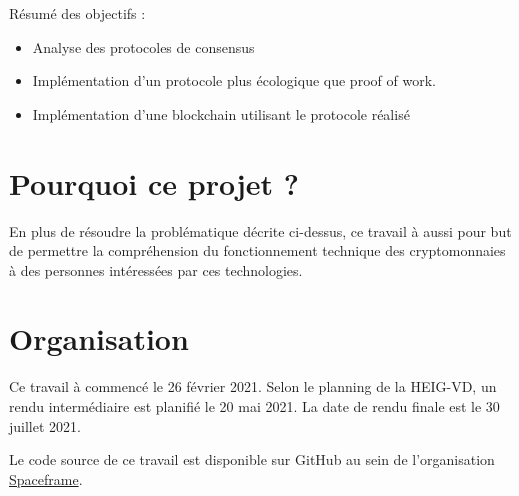 Résumé des objectifs :
\begin{itemize}
    \item Analyse des protocoles de consensus
    \item Implémentation d'un protocole plus écologique que proof of work.
    \item Implémentation d'une blockchain utilisant le protocole réalisé
\end{itemize}

\section{Pourquoi ce projet ?}

En plus de résoudre la problématique décrite ci-dessus, ce travail à aussi pour but de permettre la compréhension du fonctionnement technique des cryptomonnaies à des personnes intéressées par ces technologies.

\section{Organisation}

Ce travail à commencé le 26 février 2021.
Selon le planning de la HEIG-VD, un rendu intermédiaire est planifié le 20 mai 2021. La date de rendu finale est le 30 juillet 2021.

Le code source de ce travail est disponible sur GitHub au sein de l'organisation \href{https://github.com/spaceframeos}{Spaceframe}.